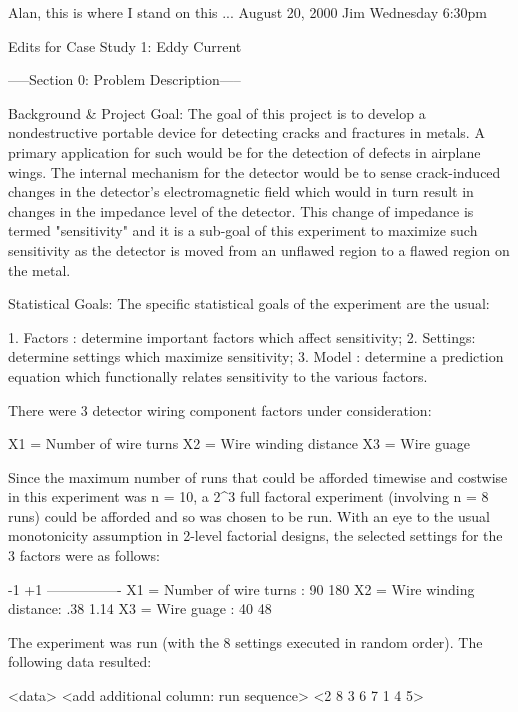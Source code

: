 Alan, this is where I stand on this ... August 20, 2000
Jim Wednesday 6:30pm

Edits for Case Study 1: Eddy Current


-----Section 0: Problem Description-----

Background & Project Goal:
The goal of this project is to develop a
nondestructive portable device for detecting
cracks and fractures in metals.  A primary
application for such would be for the detection of
defects in airplane wings.  The internal mechanism
for the detector would be to sense crack-induced
changes in the detector's electromagnetic field
which would in turn result in changes in the
impedance level of the detector.  This change of
impedance is termed "sensitivity" and it is a
sub-goal of this experiment to maximize such
sensitivity as the detector is moved from an
unflawed region to a flawed region on the metal.

Statistical Goals:
The specific statistical goals of the experiment
are the usual:

   1. Factors : determine important factors which
                affect sensitivity;
   2. Settings: determine settings which
                maximize sensitivity;
   3. Model   : determine a prediction equation which
                functionally relates sensitivity
                to the various factors.

There were 3 detector wiring component factors
under consideration:

   X1 = Number of wire turns
   X2 = Wire winding distance
   X3 = Wire guage

Since the maximum number of runs that could be
afforded timewise and costwise in this experiment
was n = 10, a 2^3 full factoral experiment
(involving n = 8 runs) could be afforded and so
was chosen to be run.  With an eye to the usual
monotonicity assumption in 2-level factorial
designs, the selected settings for the 3 factors
were as follows:

                                      -1         +1
                                     ----------------
   X1 = Number of wire turns :         90        180
   X2 = Wire winding distance:        .38        1.14
   X3 = Wire guage           :         40         48

The experiment was run (with the 8 settings
executed in random order). The following data
resulted:

<data>
   <add additional column: run sequence>
   <2 8 3 6 7 1 4 5>

